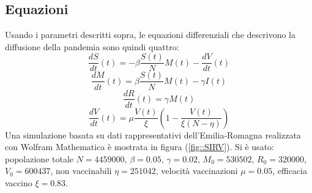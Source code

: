 \documentclass{article}
\begin{document}
\subsection{Equazioni}
Usando i parametri descritti sopra, le equazioni differenziali che 
descrivono la diffusione della pandemia sono quindi quattro:\\
\begin{equation} \label{eq::S}
\frac{dS}{dt}(t)= -\beta \frac{S(t)}{N}M(t) - \frac{dV}{dt}(t)
\end{equation}
\begin{equation}\label{eq::M}
\frac{dM}{dt}(t)= \beta \frac{S(t)}{N}M(t) - \gamma I(t)
\end{equation}
\begin{equation}\label{eq::R}
\frac{dR}{dt}(t)= \gamma M(t)
\end{equation}
\begin{equation}\label{eq::V}
\frac{dV}{dt}(t)= \mu\frac{V(t)}{\xi}\left( 1-\frac{V(t)}{\xi(N-\eta)}\right)
\end{equation}
Una simulazione basata su dati rappresentativi dell'Emilia-Romagna
realizzata con Wolfram Mathematica è mostrata in figura 
(\ref{fig::SIRV}). 
Si è usato: popolazione totale $N=4459000$, $\beta=0.05$, 
$\gamma=0.02$, $M_0 = 530502$, $R_0 = 320000$, $V_0 = 600437$,
non vaccinabili $\eta = 251042$, 
velocità vaccinazioni $\mu = 0.05$, efficacia 
vaccino $\xi= 0.83$.
\end{document}
